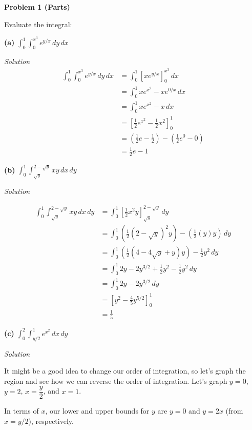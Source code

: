 \documentclass{article}
\newcommand{\lrp}[1]{\left( #1 \right)}
\newcommand{\lrb}[1]{\left[ #1 \right]}
\newcommand{\Solution}{\textit{Solution}}
\begin{document}
{}\textbf{Problem 1 (Parts)}

Evaluate the integral:

{}\textbf{(a)} $\displaystyle \int_0^1\int_0^{x^3}e^{y/x}\,dy\,dx$

\Solution
\begin{align*}
    \int_0^1\int_0^{x^3}e^{y/x}\,dy\,dx&=\int_0^1 \lrb{xe^{y/x}}_0^{x^3}\,dx\\
    &=\int_0^1 xe^{x^2} - xe^{0/x}\,dx\\
    &=\int_0^1 xe^{x^2}-x\,dx\tag{$e^0=1$}\\
    &=\lrb{\frac{1}{2}e^{x^2}-\frac{1}{2}x^2}_0^1\\
    &=\lrp{\frac{1}{2}e-\frac{1}{2}}-\lrp{\frac{1}{2}e^0-0}\\
    &=\boxed{\frac{1}{2}e-1}
\end{align*}
\textbf{(b)} $\displaystyle\int_0^1\int_{\sqrt{y}}^{2-\sqrt{y}}xy\,dx\,dy$

\Solution

\begin{align*}
    \int_0^1\int_{\sqrt{y}}^{2-\sqrt{y}}xy\,dx\,dy &=\int_0^1 \lrb{\frac{1}{2}x^2y}_{\sqrt{y}}^{2-\sqrt{y}}\,dy\\
    &=\int_0^1\lrp{\frac{1}{2}\lrp{2-\sqrt{y}}^2y}-\lrp{\frac{1}{2}(y)y}\,dy\\
    &=\int_0^1 \lrp{\frac{1}{2}\lrp{4-4\sqrt{y}+y}y}-\frac{1}{2}y^2\,dy\\
    &=\int_0^1 2 y- 2y^{3/2}+\frac{1}{2}y^2 -\frac{1}{2}y^2\,dy\\
    &=\int_0^1 2 y- 2y^{3/2}\,dy\\
    &=\lrb{y^2-\frac{4}{5}y^{5/2}}_0^1\\
    &=\boxed{\frac{1}{5}}
\end{align*}
{}\textbf{(c)} $\displaystyle \int_0^2\int_{y/2}^1 e^{x^2}\,dx\,dy$

\Solution

It might be a good idea to change our order of integration, so let's graph the region and see how we can reverse the order of integration. Let's graph $y=0$, $y=2$, $x=\dfrac{y}{2}$, and $x=1$.
\begin{center}
\end{center}
In terms of $x$, our lower and upper bounds for $y$ are $y=0$ and $y=2x$ (from $x=y/2$), respectively.
\end{document}
